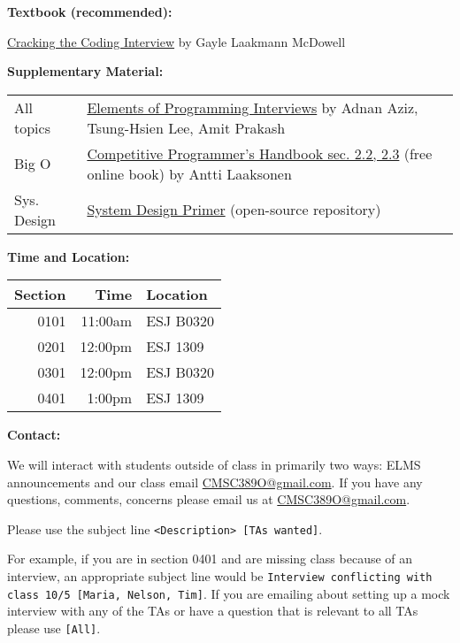 \documentclass[12pt]{article}
\begin{document}
\noindent\textbf{Textbook (recommended): }

\noindent\href{https://www.amazon.com/Cracking-Coding-Interview-Programming-Questions/dp/0984782850/}{Cracking the Coding Interview}
{\small by Gayle Laakmann McDowell} \medskip

\noindent\textbf{Supplementary Material: }

\begin{table}[hbt!]
  \begin{tabular}{@{}ll}
    All topics & \href{https://www.amazon.com/Elements-Programming-Interviews-Python-Insiders/dp/1537713949}{Elements of Programming Interviews} {\small by Adnan Aziz, Tsung-Hsien Lee, Amit Prakash} \\
    Big O & \href{https://cses.fi/book/index.html}{Competitive Programmer's Handbook sec. 2.2, 2.3} {\small (free online book) by Antti Laaksonen} \\ 
    Sys. Design & \href{https://github.com/donnemartin/system-design-primer}{System Design Primer} (open-source repository)
  \end{tabular}
\end{table}


\medskip

\noindent\textbf{Time and Location:}
\begin{table}[H]
  \begin{tabular}{rrl}
    Section & Time    & Location  \\
    \hline
    0101 & 11:00am & ESJ B0320 \\
    0201 & 12:00pm & ESJ 1309  \\
    0301 & 12:00pm & ESJ B0320 \\
    0401 & 1:00pm  & ESJ 1309 
  \end{tabular}
\end{table}
\medskip

\noindent\textbf{Contact: }

\noindent We will interact with students outside of class in primarily two ways:
ELMS announcements and our class email \href{mailto:CMSC389O@gmail.com}{CMSC389O@gmail.com}.
If you have any questions, comments, concerns please email us at \href{mailto:CMSC389O@gmail.com}{CMSC389O@gmail.com}.

Please use the subject line \texttt{<Description> [TAs wanted]}.

For example, if you are in section 0401 and are missing class because of an interview,
an appropriate subject line would be
\texttt{Interview conflicting with class 10/5 [Maria, Nelson, Tim]}.
If you are emailing about setting up a mock interview with any of the TAs
or have a question that is relevant to all TAs please use \texttt{[All]}.
\end{document}
